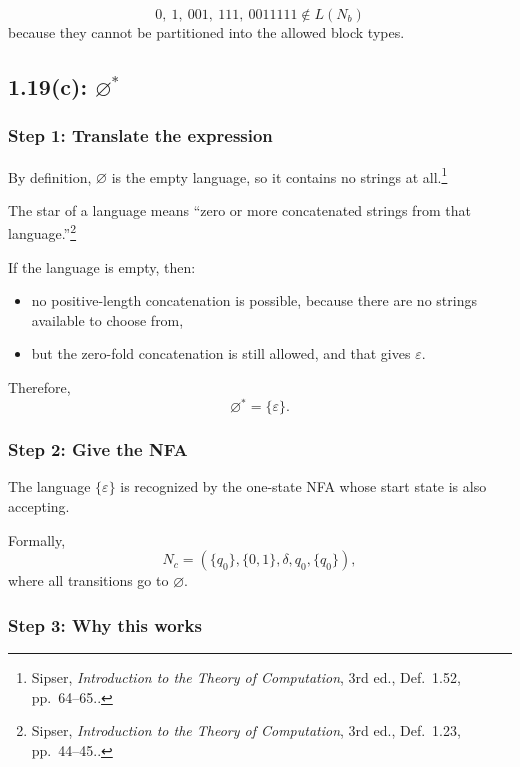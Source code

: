 \documentclass[12pt]{article}
\newcommand{\sipser}[1]{\footnote{Sipser, \emph{Introduction to the Theory of Computation}, 3rd ed., #1.}}
\begin{document}
\[
0,\ 1,\ 001,\ 111,\ 0011111 \notin L(N_b)
\]
because they cannot be partitioned into the allowed block types.

\subsection*{1.19(c): \(\varnothing^*\)}

\subsubsection*{Step 1: Translate the expression}

By definition, \(\varnothing\) is the empty language, so it contains no strings at all.\sipser{Def.~1.52, pp.~64--65.}

The star of a language means ``zero or more concatenated strings from that language.''\sipser{Def.~1.23, pp.~44--45.}

If the language is empty, then:
\begin{itemize}[itemsep=0.3em]
    \item no positive-length concatenation is possible, because there are no strings available to choose from,
    \item but the zero-fold concatenation is still allowed, and that gives \(\varepsilon\).
\end{itemize}

Therefore,
\[
\varnothing^*=\{\varepsilon\}.
\]

\subsubsection*{Step 2: Give the NFA}

The language \(\{\varepsilon\}\) is recognized by the one-state NFA whose start state is also accepting.

\begin{center}
\end{center}

Formally,
\[
N_c=(\{q_0\},\{0,1\},\delta,q_0,\{q_0\}),
\]
where all transitions go to \(\varnothing\).

\subsubsection*{Step 3: Why this works}
\end{document}
